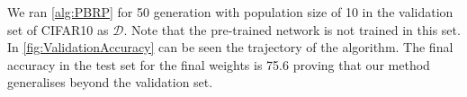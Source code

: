 We ran \cref{alg:PBRP} for 50 generation with population size of 10 in the validation set of CIFAR10  as $\mathcal{D}$. Note that the pre-trained network is not trained in this set. In \cref{fig:ValidationAccuracy} can be seen the trajectory of the algorithm. The final accuracy in the test set for the final weights is 75.6 proving that our method generalises beyond the validation set.









 














